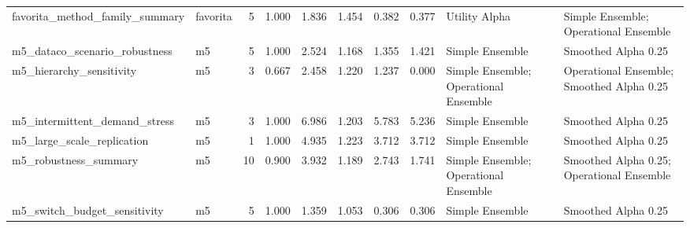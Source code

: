 \begin{table}
{\begin{tabular}{llrrrrrrll}
              favorita\_method\_family\_summary &     favorita &                       5 &                                     1.000 &                           1.836 &                             1.454 &                         0.382 &                           0.377 &                          Utility Alpha &      Simple Ensemble; Operational Ensemble \\
               m5\_dataco\_scenario\_robustness &           m5 &                       5 &                                     1.000 &                           2.524 &                             1.168 &                         1.355 &                           1.421 &                        Simple Ensemble &                        Smoothed Alpha 0.25 \\
                    m5\_hierarchy\_sensitivity &           m5 &                       3 &                                     0.667 &                           2.458 &                             1.220 &                         1.237 &                           0.000 &  Simple Ensemble; Operational Ensemble &  Operational Ensemble; Smoothed Alpha 0.25 \\
               m5\_intermittent\_demand\_stress &           m5 &                       3 &                                     1.000 &                           6.986 &                             1.203 &                         5.783 &                           5.236 &                        Simple Ensemble &                        Smoothed Alpha 0.25 \\
                  m5\_large\_scale\_replication &           m5 &                       1 &                                     1.000 &                           4.935 &                             1.223 &                         3.712 &                           3.712 &                        Simple Ensemble &                        Smoothed Alpha 0.25 \\
                       m5\_robustness\_summary &           m5 &                      10 &                                     0.900 &                           3.932 &                             1.189 &                         2.743 &                           1.741 &  Simple Ensemble; Operational Ensemble &  Smoothed Alpha 0.25; Operational Ensemble \\
                m5\_switch\_budget\_sensitivity &           m5 &                       5 &                                     1.000 &                           1.359 &                             1.053 &                         0.306 &                           0.306 &                        Simple Ensemble &                        Smoothed Alpha 0.25 \\

\end{tabular}}
\end{table}
